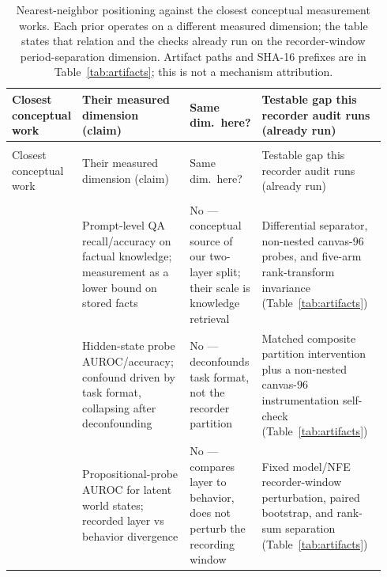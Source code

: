 \documentclass{article}
\begin{document}
\begingroup
\footnotesize
\setlength{\tabcolsep}{3.2pt}
\setlength{\LTpre}{3pt}
\setlength{\LTpost}{6pt}
\setlength{\LTcapwidth}{\linewidth}
\begin{longtable}{@{}>{\raggedright\arraybackslash}p{0.17\linewidth}
                >{\raggedright\arraybackslash}p{0.30\linewidth}
                >{\raggedright\arraybackslash}p{0.12\linewidth}
                >{\raggedright\arraybackslash}p{0.35\linewidth}@{}}
\caption{Nearest-neighbor positioning against the closest conceptual
measurement works. Each prior operates on a different measured dimension; the
table states that relation and the checks already run on the recorder-window
period-separation dimension. Artifact paths and SHA-16 prefixes are in
Table~\ref{tab:artifacts}; this is not a mechanism attribution.}
\label{tab:nnpos}\\
\toprule
Closest conceptual work & Their measured dimension (claim) & Same dim.\ here? & Testable gap this recorder audit runs (already run) \\
\midrule
\endfirsthead
\multicolumn{4}{@{}l}{\footnotesize\itshape Table~\thetable{} continued}\\
\toprule
Closest conceptual work & Their measured dimension (claim) & Same dim.\ here? & Testable gap this recorder audit runs (already run) \\
\midrule
\endhead
\midrule
\multicolumn{4}{r@{}}{\footnotesize\itshape Continued on next page}\\
\endfoot
\bottomrule
\endlastfoot
\citet{jiang2020know} & Prompt-level QA recall/accuracy on factual knowledge; measurement as a lower bound on stored facts & No --- conceptual source of our two-layer split; their scale is knowledge retrieval & Differential separator, non-nested canvas-$96$ probes, and five-arm rank-transform invariance (Table~\ref{tab:artifacts}) \\
\citet{sahoo2026linearprobes} & Hidden-state probe AUROC/accuracy; confound driven by task format, collapsing after deconfounding & No --- deconfounds task format, not the recorder partition & Matched composite partition intervention plus a non-nested canvas-$96$ instrumentation self-check (Table~\ref{tab:artifacts}) \\
\citet{feng2024monitoring} & Propositional-probe AUROC for latent world states; recorded layer vs behavior divergence & No --- compares layer to behavior, does not perturb the recording window & Fixed model/NFE recorder-window perturbation, paired bootstrap, and rank-sum separation (Table~\ref{tab:artifacts}) \\
\end{longtable}
\endgroup
\end{document}
